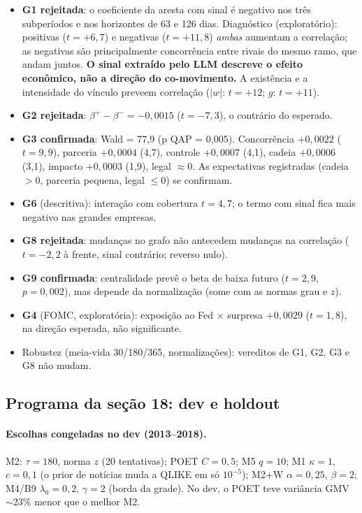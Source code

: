 \documentclass[11pt,a4paper]{article}
\begin{document}
\begin{itemize}
  \item \textbf{G1 rejeitada}: o coeficiente da aresta com sinal é negativo nos três subperíodos e nos
        horizontes de 63 e 126 dias. Diagnóstico (exploratório): positivas ($t=+6{,}7$) e negativas ($t=+11{,}8$)
        \emph{ambas} aumentam a correlação; as negativas são principalmente concorrência entre rivais do
        mesmo ramo, que andam juntos. \textbf{O sinal extraído pelo LLM descreve o efeito econômico, não a
        direção do co-movimento.} A existência e a intensidade do vínculo preveem correlação ($|w|$:
        $t=+12$; $g$: $t=+11$).
  \item \textbf{G2 rejeitada}: $\beta^+-\beta^-=-0{,}0015$ ($t=-7{,}3$), o contrário do esperado.
  \item \textbf{G3 confirmada}: Wald = 77,9 (p QAP = 0,005). Concorrência $+0{,}0022$ ($t=9{,}9$), parceria
        $+0{,}0004$ (4,7), controle $+0{,}0007$ (4,1), cadeia $+0{,}0006$ (3,1), impacto $+0{,}0003$ (1,9),
        legal $\approx0$. As expectativas registradas (cadeia $>0$, parceria pequena, legal $\le0$) se confirmam.
  \item \textbf{G6} (descritiva): interação com cobertura $t=4{,}7$; o termo com sinal fica mais negativo
        nas grandes empresas.
  \item \textbf{G8 rejeitada}: mudanças no grafo não antecedem mudanças na correlação ($t=-2{,}2$ à frente,
        sinal contrário; reverso nulo).
  \item \textbf{G9 confirmada}: centralidade prevê o beta de baixa futuro ($t=2{,}9$, $p=0{,}002$), mas depende
        da normalização (some com as normas grau e $z$).
  \item \textbf{G4} (FOMC, exploratória): exposição ao Fed $\times$ surpresa $+0{,}0029$ ($t=1{,}8$), na direção
        esperada, não significante.
  \item Robustez (meia-vida 30/180/365, normalizações): vereditos de G1, G2, G3 e G8 não mudam.
\end{itemize}

\subsection{Programa da seção 18: dev e holdout}

\paragraph{Escolhas congeladas no dev (2013--2018).} M2: $\tau=180$, norma $z$ (20 tentativas); POET
$C=0{,}5$; M5 $q=10$; M1 $\kappa=1$, $c=0{,}1$ (o prior de notícias muda a QLIKE em só $10^{-5}$);
M2+W $\alpha=0{,}25$, $\beta=2$; M4/B9 $\lambda_0=0{,}2$, $\gamma=2$ (borda da grade). No dev, o POET
teve variância GMV $\sim$23\% menor que o melhor M2.
\end{document}
